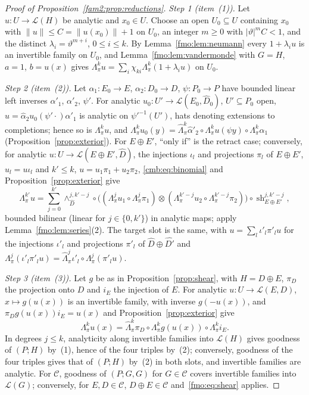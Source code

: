 \documentclass[11pt]{amsart}
\theoremstyle{definition}
\theoremstyle{remark}
\numberwithin{equation}{section}
\newcommand{\cL}{\mathcal L}
\newcommand{\abs}[1]{\lvert #1\rvert}
\newcommand{\norm}[1]{\lVert #1\rVert}
\newcommand{\cC}{\mathcal{C}}
\theoremstyle{plain}
\theoremstyle{definition}
\theoremstyle{plain}
\newcommand{\sh}{\operatorname{sh}}
\newcommand{\hLambda}{\widehat\Lambda}
\begin{document}
\begin{proof}[Proof of Proposition~\ref{fam2:prop:reductions}]
\emph{Step 1 (item~(1)).} Let $u\colon U\to\cL(H)$ be analytic and $x_0\in U$. Choose an open $U_0\subseteq U$
containing $x_0$ with $\norm u\le C=\norm{u(x_0)}+1$ on $U_0$, an integer $m\ge0$ with $\abs\vartheta^mC<1$, and the
distinct $\lambda_i=\vartheta^{m+i}$, $0\le i\le k$. By Lemma~\ref{fmo:lem:neumann} every $1+\lambda_iu$ is an invertible
family on $U_0$, and Lemma~\ref{fmo:lem:vandermonde} with $G=H$, $a=1$, $b=u(x)$ gives
$\Lambda^k_\pi u=\sum_i\chi_{ki}\Lambda^k_\pi(1+\lambda_iu)$ on $U_0$.

\emph{Step 2 (item~(2)).} Let $\alpha_1\colon E_0\to E$, $\alpha_2\colon D_0\to D$, $\psi\colon P_0\to P$ have bounded linear
left inverses $\alpha'_1$, $\alpha'_2$, $\psi'$. For analytic $u_0\colon U'\to\cL(E_0,\widehat D_0)$, $U'\subseteq P_0$
open, $u=\hat\alpha_2u_0(\psi'\cdot)\alpha'_1$ is analytic on $\psi'^{-1}(U')$, hats denoting extensions to completions;
hence so is $\Lambda^k_\pi u$, and $\Lambda^k_\pi u_0(y)=\hLambda^k_\pi\hat\alpha'_2\circ\Lambda^k_\pi u(\psi y)\circ
\Lambda^k_\pi\alpha_1$ (Proposition~\ref{prop:exterior}). For $E\oplus E'$, ``only if'' is the retract case; conversely,
for analytic $u\colon U\to\cL(E\oplus E',\widehat D)$, the injections $\iota_l$ and projections $\pi_l$ of $E\oplus E'$,
$u_l=u\iota_l$ and $k'\le k$, $u=u_1\pi_1+u_2\pi_2$, \eqref{cmb:eq:binomial} and Proposition~\ref{prop:exterior} give
\[\Lambda^{k'}_\pi u=\sum_{j=0}^{k'}\wedge^{j,k'-j}_{\widehat D}\circ\bigl((\Lambda^j_\pi u_1\circ\Lambda^j_\pi\pi_1)\otimes
(\Lambda^{k'-j}_\pi u_2\circ\Lambda^{k'-j}_\pi\pi_2)\bigr)\circ\sh^{j,k'-j}_{E\oplus E'},\]
bounded bilinear (linear for $j\in\{0,k'\}$) in analytic maps; apply Lemma~\ref{fmo:lem:series}(2). The target slot is the
same, with $u=\sum_l\iota'_l\pi'_lu$ for the injections $\iota'_l$ and projections $\pi'_l$ of
$\widehat D\oplus\widehat{D'}$ and $\Lambda^j_\pi(\iota'_l\pi'_lu)=\hLambda^j_\pi\iota'_l\circ\Lambda^j_\pi(\pi'_lu)$.

\emph{Step 3 (item~(3)).} Let $g$ be as in Proposition~\ref{prop:shear}, with $H=D\oplus E$, $\pi_D$ the projection onto
$D$ and $i_E$ the injection of $E$. For analytic $u\colon U\to\cL(E,D)$, $x\mapsto g(u(x))$ is an invertible family, with
inverse $g(-u(x))$, and $\pi_Dg(u(x))i_E=u(x)$ and Proposition~\ref{prop:exterior} give
\begin{equation}\label{fmo:eq:shear}
 \Lambda^k_\pi u(x)=\hLambda^k_\pi\pi_D\circ\Lambda^k_\pi g(u(x))\circ\Lambda^k_\pi i_E .
\end{equation}
In degrees $j\le k$, analyticity along invertible families into $\cL(H)$ gives goodness of $(P;H)$ by~(1), hence of the
four triples by~(2); conversely, goodness of the four triples gives that of $(P;H)$ by~(2) in both slots, and invertible
families are analytic. For $\cC$, goodness of $(P;G,G)$ for $G\in\cC$ covers invertible families into $\cL(G)$;
conversely, for $E,D\in\cC$, $D\oplus E\in\cC$ and~\eqref{fmo:eq:shear} applies.
\end{proof}
\end{document}
